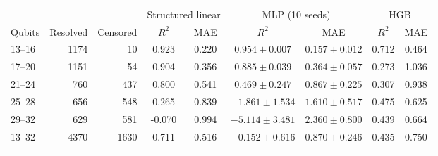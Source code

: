 \begin{tabular}{lrrcccccc}
\toprule
 & & & \multicolumn{2}{c}{Structured linear} & \multicolumn{2}{c}{MLP (10 seeds)} & \multicolumn{2}{c}{HGB} \\
\cmidrule(lr){4-5}\cmidrule(lr){6-7}\cmidrule(lr){8-9}
Qubits & Resolved & Censored & $R^2$ & MAE & $R^2$ & MAE & $R^2$ & MAE \\
\midrule
13--16 & 1174 & 10 & 0.923 & 0.220 & $0.954 \pm 0.007$ & $0.157 \pm 0.012$ & 0.712 & 0.464 \\
17--20 & 1151 & 54 & 0.904 & 0.356 & $0.885 \pm 0.039$ & $0.364 \pm 0.057$ & 0.273 & 1.036 \\
21--24 & 760 & 437 & 0.800 & 0.541 & $0.469 \pm 0.247$ & $0.867 \pm 0.225$ & 0.307 & 0.938 \\
25--28 & 656 & 548 & 0.265 & 0.839 & $-1.861 \pm 1.534$ & $1.610 \pm 0.517$ & 0.475 & 0.625 \\
29--32 & 629 & 581 & -0.070 & 0.994 & $-5.114 \pm 3.481$ & $2.360 \pm 0.800$ & 0.439 & 0.664 \\
\midrule
13--32 & 4370 & 1630 & 0.711 & 0.516 & $-0.152 \pm 0.616$ & $0.870 \pm 0.246$ & 0.435 & 0.750 \\
\botrule
\end{tabular}
